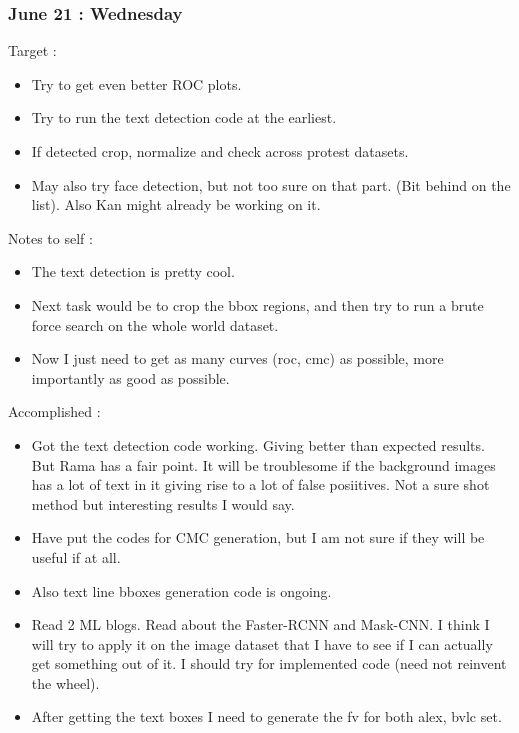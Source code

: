 \documentclass{article}
\begin{document}
\subsubsection{June 21 : Wednesday}
Target :
\begin{itemize}
\item Try to get even better ROC plots.
\item Try to run the text detection code at the earliest.
\item If detected crop, normalize and check across protest datasets.
\item May also try face detection, but not too sure on that part. (Bit behind on the list). Also Kan might already be working on it.
\end{itemize}

Notes to self :
\begin{itemize}
\item The text detection is pretty cool.
\item Next task would be to crop the bbox regions, and then try to run a brute force search on the whole world dataset.
\item Now I just need to get as many curves (roc, cmc) as possible, more importantly as good as possible.
\end{itemize}

Accomplished :
\begin{itemize}
\item Got the text detection code working. Giving better than expected results. But Rama has a fair point. It will be troublesome if the background images has a lot of text in it giving rise to a lot of false posiitives. Not a sure shot method but interesting results I would say.
\item Have put the codes for CMC generation, but I am not sure if they will be useful if at all.
\item Also text line bboxes generation code is ongoing.
\item Read 2 ML blogs. Read about the Faster-RCNN and Mask-CNN. I think I will try to apply it on the image dataset that I have to see if I can actually get something out of it. I should try for implemented code (need not reinvent the wheel).
\item After getting the text boxes I need to generate the fv for both alex, bvlc set.
\end{itemize}
\end{document}

